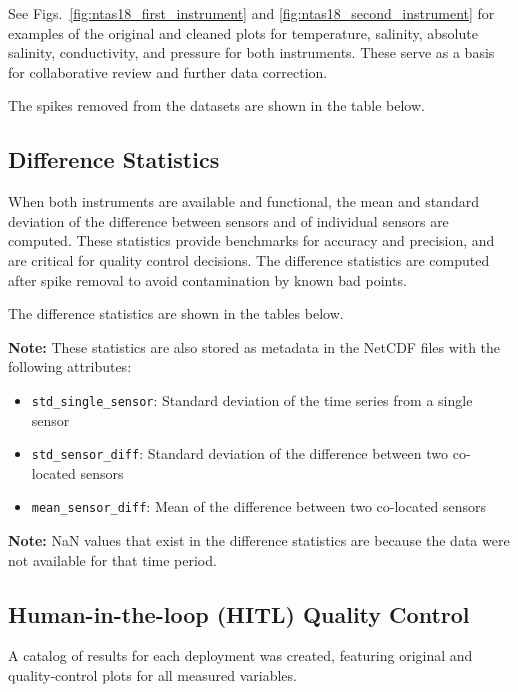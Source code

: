 See Figs.~\ref{fig:ntas18_first_instrument} and \ref{fig:ntas18_second_instrument} for examples of the original and cleaned plots for temperature, salinity, absolute salinity, conductivity, and pressure for both instruments.
These serve as a basis for collaborative review and further data correction.

The spikes removed from the datasets are shown in the table below.



\subsection{Difference Statistics}
When both instruments are available and functional, 
the mean and standard deviation of the difference between sensors and of individual sensors are computed. 
These statistics provide benchmarks for accuracy and precision, and are critical for quality control decisions.
The difference statistics are computed after spike removal to avoid contamination by known bad points.

The difference statistics are shown in the tables below.



\textbf{Note:} These statistics are also stored as metadata in the NetCDF files with the following attributes:
\begin{itemize}
\item \texttt{std\_single\_sensor}: Standard deviation of the time series from a single sensor
\item \texttt{std\_sensor\_diff}: Standard deviation of the difference between two co-located sensors
\item \texttt{mean\_sensor\_diff}: Mean of the difference between two co-located sensors
\end{itemize}

\textbf{Note:} NaN values that exist in the difference statistics are because the data were not available for that time period.

\subsection{Human-in-the-loop (HITL) Quality Control}
A catalog of results for each deployment was created, featuring original and quality-control plots for all measured variables. 

